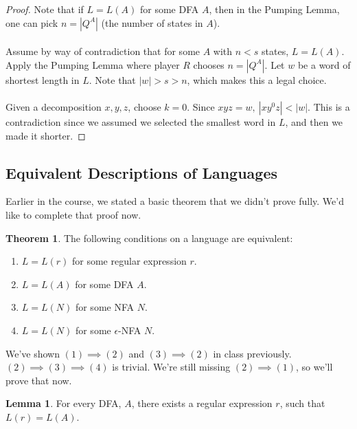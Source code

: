 \documentclass[]{article}
\theoremstyle{definition}
\newtheorem*{theorem}{Theorem}
\newtheorem*{lemma}{Lemma}
\begin{document}
        \begin{proof}
          Note that if $L = L(A)$ for some DFA $A$, then in the Pumping Lemma, one can pick $n = |Q^A|$ (the number of states in $A$).
          \\ \\
          Assume by way of contradiction that for some $A$ with $n < s$ states, $L = L(A)$. Apply the Pumping Lemma where player $R$ chooses $n = |Q^A|$. Let $w$ be a word of shortest length in $L$. Note that $|w| > s > n$, which makes this a legal choice.
          \\ \\
          Given a decomposition $x, y, z$, choose $k = 0$. Since $xyz = w,~ |xy^0z| < |w|$. This is a contradiction since we assumed we selected the smallest word in $L$, and then we made it shorter.
        \end{proof}

      \subsection{Equivalent Descriptions of Languages}
        Earlier in the course, we stated a basic theorem that we didn't prove fully. We'd like to complete that proof now.

        \begin{theorem}
          The following conditions on a language are equivalent:
          \begin{enumerate}
            \item $L = L(r)$ for some regular expression $r$.
            \item $L = L(A)$ for some DFA $A$.
            \item $L = L(N)$ for some NFA $N$.
            \item $L = L(N)$ for some $\epsilon$-NFA $N$.
          \end{enumerate}
        \end{theorem}

        We've shown $(1) \implies (2)$ and $(3) \implies (2)$ in class previously. $(2) \implies (3) \implies (4)$ is trivial. We're still missing $(2) \implies (1)$, so we'll prove that now.

        \begin{lemma}
          For every DFA, $A$, there exists a regular expression $r$, such that $L(r) = L(A)$.
        \end{lemma}
\end{document}
